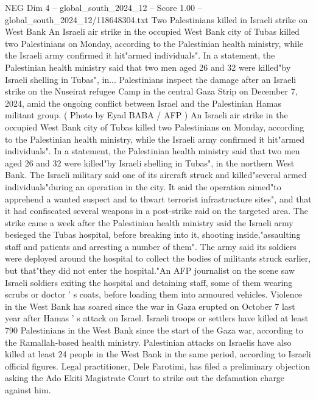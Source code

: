\begin{textsample}{NEG Dim 4 – global\_south\_2024\_12 – Score 1.00 – global\_south\_2024\_12/118648304.txt}  \label{ex:f4_neg_230}
Two Palestinians killed in Israeli strike on West Bank An Israeli air strike in the occupied West Bank city of Tubas killed two Palestinians on Monday, according to the Palestinian health ministry, while the Israeli army confirmed it hit"armed individuals".
In a statement, the Palestinian health ministry said that two men aged 26 and 32 were killed"by Israeli shelling in Tubas", in...
Palestinians inspect the damage after an Israeli strike on the Nuseirat refugee Camp in the central Gaza Strip on December 7, 2024, amid the ongoing conflict between Israel and the Palestinian Hamas militant group. ( Photo by Eyad BABA / AFP ) An Israeli air strike in the occupied West Bank city of Tubas killed two Palestinians on Monday, according to the Palestinian health ministry, while the Israeli army confirmed it hit"armed individuals".
In a statement, the Palestinian health ministry said that two men aged 26 and 32 were killed"by Israeli shelling in Tubas", in the northern West Bank.
The Israeli military said one of its aircraft struck and killed"several armed individuals"during an operation in the city.
It said the operation aimed"to apprehend a wanted suspect and to thwart terrorist infrastructure sites", and that it had confiscated several weapons in a post-strike raid on the targeted area.
The strike came a week after the Palestinian health ministry said the Israeli army besieged the Tubas hospital, before breaking into it, shooting inside,"assaulting staff and patients and arresting a number of them".
The army said its soldiers were deployed around the hospital to collect the bodies of militants struck earlier, but that"they did not enter the hospital."An AFP journalist on the scene saw Israeli soldiers exiting the hospital and detaining staff, some of them wearing scrubs or doctor ' s coats, before loading them into armoured vehicles.
Violence in the West Bank has soared since the war in Gaza erupted on October 7 last year after Hamas ' s attack on Israel.
Israeli troops or settlers have killed at least 790 Palestinians in the West Bank since the start of the Gaza war, according to the Ramallah-based health ministry.
Palestinian attacks on Israelis have also killed at least 24 people in the West Bank in the same period, according to Israeli official figures.
Legal practitioner, Dele Farotimi, has filed a preliminary objection asking the Ado Ekiti Magistrate Court to strike out the defamation charge against him.

\end{textsample}
